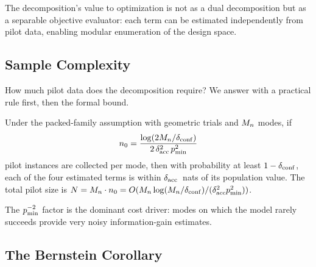 The decomposition's value to optimization is not as a dual decomposition but as a separable objective evaluator: each term can be estimated independently from pilot data, enabling modular enumeration of the design space.

\subsection{Sample Complexity}
\label{sec:sample-complexity}

How much pilot data does the decomposition require?
We answer with a practical rule first, then the formal bound.

\begin{center}
\end{center}

\begin{proposition}
\label{prop:sample-complexity}
Under the packed-family assumption with geometric trials and $M_n$ modes, if
\begin{equation}
\label{eq:hoeffding-sample}
  n_0 = \frac{\log(2M_n / \delta_{\mathrm{conf}})}{2\,\delta_{\mathrm{acc}}^2\,p_{\min}^2}
\end{equation}
pilot instances are collected per mode, then with probability at least $1 - \delta_{\mathrm{conf}}$, each of the four estimated terms is within $\delta_{\mathrm{acc}}$~nats of its population value.
The total pilot size is $N = M_n \cdot n_0 = O(M_n \log(M_n/\delta_{\mathrm{conf}}) / (\delta_{\mathrm{acc}}^2 p_{\min}^2))$.
\end{proposition}

The $p_{\min}^{-2}$ factor is the dominant cost driver: modes on which the model rarely succeeds provide very noisy information-gain estimates.

\subsection{The Bernstein Corollary}
\label{sec:bernstein}

